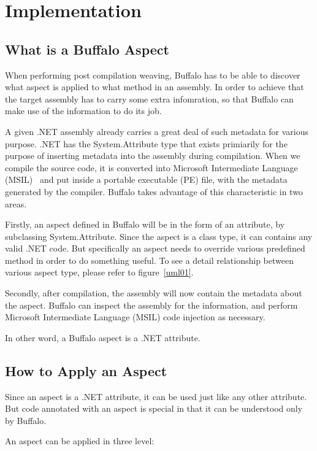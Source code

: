 \chapter{Implementation}

\section{What is a Buffalo Aspect}

When performing post compilation weaving, Buffalo has to be able to discover what aspect is applied to what method in an assembly. In order to achieve that the target assembly has to carry some extra infomration, so that Buffalo can make use of the information to do its job.

A given .NET assembly already carries a great deal of such metadata for various purpose. .NET has the System.Attribute type that exists primiarily for the purpose of inserting metadata into the assembly during compilation. When we compile the source code, it is converted into Microsoft Intermediate Language (MSIL)~\cite{msil_text} and put inside a portable executable (PE) file, with the metadata generated by the compiler. Buffalo takes advantage of this characteristic in two areas.

Firstly, an aspect defined in Buffalo will be in the form of an attribute, by subclassing System.Attribute. Since the aspect is a class type, it can contains any valid .NET code. But specifically an aspect needs to override various predefined method in order to do something useful. To see a detail relationship between various aspect type, please refer to figure~\ref{uml01}.

Secondly, after compilation, the assembly will now contain the metadata about the aspect. Buffalo can inspect the assembly for the information, and perform Microsoft Intermediate Language (MSIL) code injection as necessary.

In other word, a Buffalo aspect is a .NET attribute.

\section{How to Apply an Aspect}

Since an aspect is a .NET attribute, it can be used just like any other attribute. But code annotated with an aspect is special in that it can be understood only by Buffalo.

An aspect can be applied in three level:

